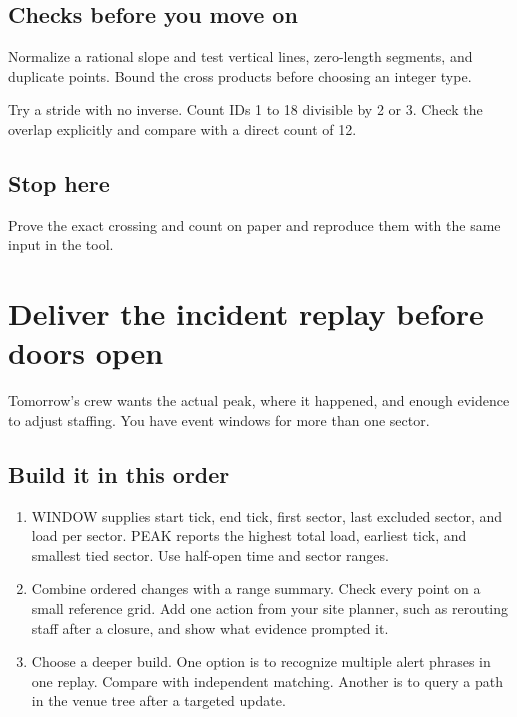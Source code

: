\documentclass[11pt,letterpaper]{article}
\begin{document}
\subsection*{Checks before you move on}

Normalize a rational slope and test vertical lines, zero-length segments, and duplicate points. Bound the cross products before choosing an integer type.

Try a stride with no inverse. Count IDs 1 to 18 divisible by 2 or 3. Check the overlap explicitly and compare with a direct count of 12.

\subsection*{Stop here}

Prove the exact crossing and count on paper and reproduce them with the same input in the tool.

\clearpage

\section{Deliver the incident replay before doors open}\label{festival:10}

Tomorrow's crew wants the actual peak, where it happened, and enough evidence to adjust staffing. You have event windows for more than one sector.

\subsection*{Build it in this order}

\begin{enumerate}
\item WINDOW supplies start tick, end tick, first sector, last excluded sector, and load per sector. PEAK reports the highest total load, earliest tick, and smallest tied sector. Use half-open time and sector ranges.
\item Combine ordered changes with a range summary. Check every point on a small reference grid. Add one action from your site planner, such as rerouting staff after a closure, and show what evidence prompted it.
\item Choose a deeper build. One option is to recognize multiple alert phrases in one replay. Compare with independent matching. Another is to query a path in the venue tree after a targeted update.
\end{enumerate}
\end{document}
